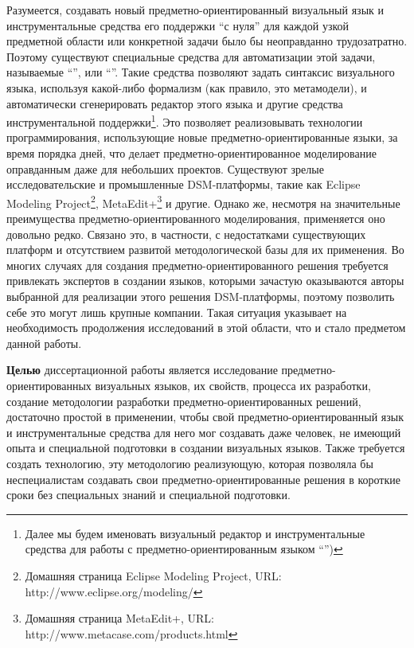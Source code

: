 Разумеется, создавать новый предметно-ориентированный визуальный язык и 
инструментальные средства его поддержки "`с нуля"' для каждой узкой предметной 
области или конкретной задачи было бы неоправданно трудозатратно. Поэтому 
существуют специальные средства для автоматизации этой задачи, называемые 
"`"', или "`"'. Такие средства позволяют задать 
синтаксис визуального языка, используя какой-либо формализм (как правило, 
это метамодели), и автоматически сгенерировать редактор этого языка и другие средства инструментальной 
поддержки\footnote{Далее мы будем именовать визуальный редактор и инструментальные средства для работы с предметно-ориентированным языком "`"')}. 
Это позволяет реализовывать технологии программирования, использующие новые предметно-ориентированные языки, за время 
порядка дней, что делает предметно-ориентированное моделирование оправданным 
даже для небольших проектов. Существуют зрелые исследовательские и промышленные 
\ac{DSM}-платформы, такие как Eclipse Modeling 
Project\footnote{Домашняя страница Eclipse Modeling Project, URL: http://www.eclipse.org/modeling/},
MetaEdit+\footnote{Домашняя страница MetaEdit+, URL: http://www.metacase.com/products.html} 
и другие. Однако же, несмотря на значительные преимущества предметно-ориентированного 
моделирования, применяется оно довольно редко. Связано это, в частности, с 
недостатками существующих платформ и отсутствием развитой методологической 
базы для их применения. 
Во многих случаях для создания предметно-ориентированного 
решения требуется привлекать экспертов в создании языков, которыми зачастую 
оказываются авторы выбранной для реализации этого решения \ac{DSM}-платформы, поэтому 
позволить себе это могут лишь крупные компании. Такая ситуация указывает на 
необходимость продолжения исследований в этой области, что и стало предметом 
данной работы.

\textbf{Целью} диссертационной работы является исследование предметно-ориентированных 
визуальных языков, их свойств, процесса их разработки, создание методологии 
разработки предметно-ориентированных решений, достаточно простой в применении, 
чтобы свой предметно-ориентированный язык и инструментальные средства для него 
мог создавать даже человек, не имеющий опыта и специальной подготовки в создании 
визуальных языков. Также требуется создать технологию, эту методологию 
реализующую, которая позволяла бы неспециалистам создавать свои 
предметно-ориентированные решения в короткие сроки без специальных знаний и 
специальной подготовки. 


